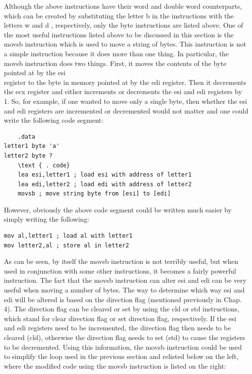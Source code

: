 \documentclass[10pt]{book}
\begin{document}
Although the above instructions have their word and double word counterparts, which can be created by substituting the letter b in the instructions with the letters w and d , respectively, only the byte instructions are listed above. One of the most useful instructions listed above to be discussed in this section is the movsb instruction which is used to move a string of bytes. This instruction is not a simple instruction because it does more than one thing. In particular, the movsb instruction does two things. First, it moves the contents of the byte pointed at by the esi\\
register to the byte in memory pointed at by the edi register. Then it decrements the ecx register and either increments or decrements the esi and edi registers by 1. So, for example, if one wanted to move only a single byte, then whether the esi and edi registers are incremented or decremented would not matter and one could write the following code segment:


\begin{verbatim}
    .data
letter1 byte 'a'
letter2 byte ?
    \text { . code}
    lea esi,letter1 ; load esi with address of letter1
    lea edi,letter2 ; load edi with address of letter2
    movsb ; move string byte from [esi] to [edi]
\end{verbatim}

However, obviously the above code segment could be written much easier by simply writing the following:

\begin{verbatim}
mov al,letter1 ; load al with letter1
mov letter2,al ; store al in letter2
\end{verbatim}

As can be seen, by itself the movsb instruction is not terribly useful, but when used in conjunction with some other instructions, it becomes a fairly powerful instruction. The fact that the movsb instruction can alter esi and edi can be very useful when moving a number of bytes. The way to determine which way esi and edi will be altered is based on the direction flag (mentioned previously in Chap. 4). The direction flag can be cleared or set by using the cld or std instructions, which stand for clear direction flag or set direction flag, respectively. If the esi and edi registers need to be incremented, the direction flag then needs to be cleared (cld), otherwise the direction flag needs to set (std) to cause the registers to be decremented. Using this information, the movsb instruction could be used to simplify the loop used in the previous section and relisted below on the left, where the modified code using the movsb instruction is listed on the right:
\end{document}
